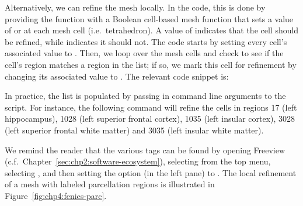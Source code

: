 Alternatively, we can refine the mesh locally. In the code, this is done by 
providing the  function with a Boolean cell-based mesh function
that sets a value of  or  at each mesh cell 
(i.e.~tetrahedron). A value of  indicates that the cell should be 
refined, while  indicates it should not. The code starts by setting 
every cell's associated value to . Then, we loop over the mesh 
cells and check to see if the cell's region matches a region in the 
 list; if so, we mark this cell for refinement by changing 
its associated value to . The relevant code snippet is: 

In practice, the  list 
is populated by passing in command line arguments to the script. For instance, 
the following command will refine the cells in regions 17 (left hippocampus), 
1028 (left superior frontal cortex), 1035 (left insular cortex), 3028 (left 
superior frontal white matter) and 3035 (left insular white matter).


We remind the reader that the various tags can be found by opening Freeview 
(c.f.~Chapter~\ref{sec:chp2:software-ecosystem}), selecting 
 from the top menu, selecting 
, and then setting the  option (in 
the left pane) to . The local refinement of a mesh with 
labeled parcellation regions is illustrated in 
Figure~\ref{fig:chp4:fenics-parc}.



